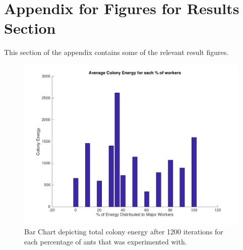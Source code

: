 \section{Appendix for Figures for Results Section}

This section of the appendix contains some of the relevant result figures.
\begin{figure}[H]
  \centering
  \includegraphics[width=1\textwidth]{images/bar-chart-results.png}
  \caption{Bar Chart depicting total colony energy after 1200 iterations for each percentage of ants that was experimented with.}
  \label{fig:iters-bar}
\end{figure}
